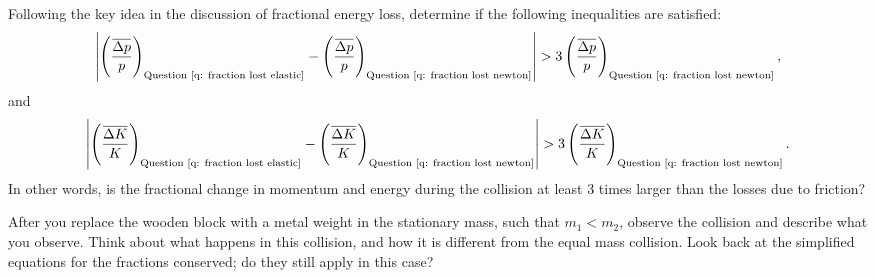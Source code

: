 \documentclass[addpoints]{physlabs}
\begin{document}
\begin{postlab}
    \filbreak
    \question[1] Following the key idea in the discussion of fractional energy loss, determine if the following inequalities are satisfied:
    \begin{equation}
        \left|\left(\frac{\overline{\Delta p}}{p}\right)_\text{Question \ref{q: fraction lost elastic}} - \left(\frac{\overline{\Delta p}}{p}\right)_\text{Question \ref{q: fraction lost newton}}\right| > 3\left(\frac{\overline{\Delta p}}{p}\right)_\text{Question \ref{q: fraction lost newton}},
    \end{equation}
    and
    \begin{equation}
        \left|\left(\frac{\overline{\Delta K}}{K}\right)_\text{Question \ref{q: fraction lost elastic}} - \left(\frac{\overline{\Delta K}}{K}\right)_\text{Question \ref{q: fraction lost newton}}\right| > 3\left(\frac{\overline{\Delta K}}{K}\right)_\text{Question \ref{q: fraction lost newton}}.
    \end{equation}
    In other words, is the fractional change in momentum and energy during the collision at least 3 times larger than the losses due to friction?
    \begin{solution}[3cm]
        
    \end{solution}

    \filbreak
    \question[1] \label{q: elastic unequal masses} After you replace the wooden block with a metal weight in the stationary mass, such that $m_1<m_2$, observe the collision and describe what you observe. Think about what happens in this collision, and how it is different from the equal mass collision. Look back at the simplified equations for the fractions conserved; do they still apply in this case?
    \begin{solution}[5cm]
        
    \end{solution}


    \newpage

    

\end{postlab}
\end{document}
